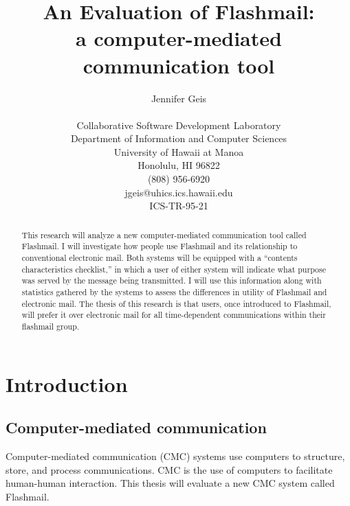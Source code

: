  \pagestyle{headings} \makeindex



\title{An Evaluation of Flashmail: \\ a computer-mediated communication
tool} \author{Jennifer Geis\\ \\ Collaborative Software Development
Laboratory\\ Department of Information and Computer Sciences\\ University
of Hawaii at Manoa\\ Honolulu, HI 96822\\ (808) 956-6920\\ {\sf
jgeis@uhics.ics.hawaii.edu}\\ {\sf ICS-TR-95-21}}\maketitle

\begin{abstract}
  This research will analyze a new computer-mediated communication tool
  called Flashmail.  I will investigate how people use Flashmail and its
  relationship to conventional electronic mail.  Both systems will be
  equipped with a ``contents characteristics checklist,'' in which a user
  of either system will indicate what purpose was served by the message
  being transmitted.  I will use this information along with statistics
  gathered by the systems to assess the differences in utility of Flashmail
  and electronic mail.  The thesis of this research is that users, once
  introduced to Flashmail, will prefer it over electronic mail for all
  time-dependent communications within their flashmail group.
\end{abstract}
\newpage
\tableofcontents
\newpage {}


\chapter{Introduction}
\section{Computer-mediated communication}
Computer-mediated communication (CMC) systems use computers to structure,
store, and process communications. CMC is the use of computers to
facilitate human-human interaction.  This thesis will evaluate a new CMC
system called Flashmail.

